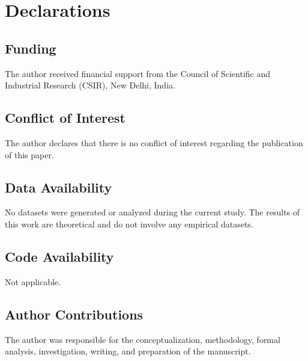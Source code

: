 \documentclass[10pt,a4paper]{article}
\theoremstyle{definition}
\theoremstyle{remark}
\numberwithin{equation}{section}
\begin{document}
\section*{Declarations}

\subsection*{Funding}

The author received financial support from the Council of Scientific and
Industrial Research (CSIR), New Delhi, India.

\subsection*{Conflict of Interest}

The author declares that there is no conflict of interest regarding the
publication of this paper.

\subsection*{Data Availability}

No datasets were generated or analyzed during the current study. The
results of this work are theoretical and do not involve any empirical
datasets.

\subsection*{Code Availability}

Not applicable.

\subsection*{Author Contributions}

The author was responsible for the conceptualization, methodology,
formal analysis, investigation, writing, and preparation of the manuscript.
\end{document}
